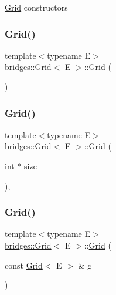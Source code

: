 \mbox{\hyperlink{classbridges_1_1_grid}{Grid}} constructors \mbox{\label{classbridges_1_1_grid_a711e05a933c2a11c9e2775c74e6cf80d}} 
\subsubsection{\texorpdfstring{Grid()}{Grid()}\hspace{0.1cm}{\footnotesize\ttfamily [2/4]}}
{\footnotesize\ttfamily template$<$typename E$>$ \\
\mbox{\hyperlink{classbridges_1_1_grid}{bridges\+::\+Grid}}$<$ E $>$\+::\mbox{\hyperlink{classbridges_1_1_grid}{Grid}} (\begin{DoxyParamCaption}{ }\end{DoxyParamCaption})\hspace{0.3cm}{\ttfamily [inline]}}

\mbox{\label{classbridges_1_1_grid_ad5c6c5e87eb40446ac794c5479937f87}} 
\subsubsection{\texorpdfstring{Grid()}{Grid()}\hspace{0.1cm}{\footnotesize\ttfamily [3/4]}}
{\footnotesize\ttfamily template$<$typename E$>$ \\
\mbox{\hyperlink{classbridges_1_1_grid}{bridges\+::\+Grid}}$<$ E $>$\+::\mbox{\hyperlink{classbridges_1_1_grid}{Grid}} (\begin{DoxyParamCaption}\item[{int $\ast$}]{size }\end{DoxyParamCaption})\hspace{0.3cm}{\ttfamily [inline]}, {\ttfamily [explicit]}}

\mbox{\label{classbridges_1_1_grid_aff3e633c9454fbc66cab5ffe0c6812db}} 
\subsubsection{\texorpdfstring{Grid()}{Grid()}\hspace{0.1cm}{\footnotesize\ttfamily [4/4]}}
{\footnotesize\ttfamily template$<$typename E$>$ \\
\mbox{\hyperlink{classbridges_1_1_grid}{bridges\+::\+Grid}}$<$ E $>$\+::\mbox{\hyperlink{classbridges_1_1_grid}{Grid}} (\begin{DoxyParamCaption}\item[{const \mbox{\hyperlink{classbridges_1_1_grid}{Grid}}$<$ E $>$ \&}]{g }\end{DoxyParamCaption})\hspace{0.3cm}{\ttfamily [inline]}}

